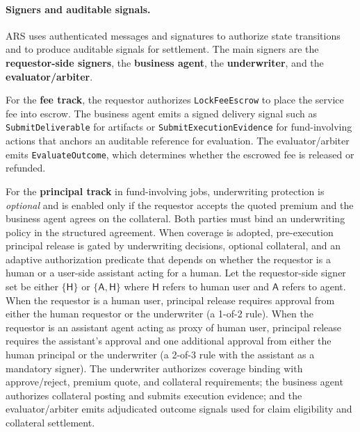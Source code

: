 \documentclass{article} %
\begin{document}
\paragraph{Signers and auditable signals.}
\textsc{ARS} uses authenticated messages and signatures to authorize state transitions and to produce auditable signals for settlement. The main signers are the \textbf{requestor-side signers}, the \textbf{business agent}, the \textbf{underwriter}, and the \textbf{evaluator/arbiter}.

For the \textbf{fee track}, the requestor authorizes \texttt{LockFeeEscrow} to place the service fee into escrow. The business agent emits a signed delivery signal such as \texttt{SubmitDeliverable} for artifacts or \texttt{SubmitExecutionEvidence} for fund-involving actions that anchors an auditable reference for evaluation. The evaluator/arbiter emits \texttt{EvaluateOutcome}, which determines whether the escrowed fee is released or refunded.

For the \textbf{principal track} in fund-involving jobs, underwriting protection is \emph{optional} and is enabled only if the requestor accepts the quoted premium and the business agent agrees on the collateral. Both parties must bind an underwriting policy in the structured agreement. When coverage is adopted, pre-execution principal release is gated by underwriting decisions, optional collateral, and an adaptive authorization predicate that depends on whether the requestor is a human or a user-side assistant acting for a human. Let the requestor-side signer set be either $\{\textsf{H}\}$ or $\{\textsf{A},\textsf{H}\}$ where $\textsf{H}$ refers to human user and $\textsf{A}$ refers to agent. When the requestor is a human user, principal release requires approval from either the human requestor or the underwriter (a 1-of-2 rule). When the requestor is an assistant agent acting as proxy of human user, principal release requires the assistant's approval and one additional approval from either the human principal or the underwriter (a 2-of-3 rule with the assistant as a mandatory signer). The underwriter authorizes coverage binding with approve/reject, premium quote, and collateral requirements; the business agent authorizes collateral posting and submits execution evidence; and the evaluator/arbiter emits adjudicated outcome signals used for claim eligibility and collateral settlement.
\end{document}
